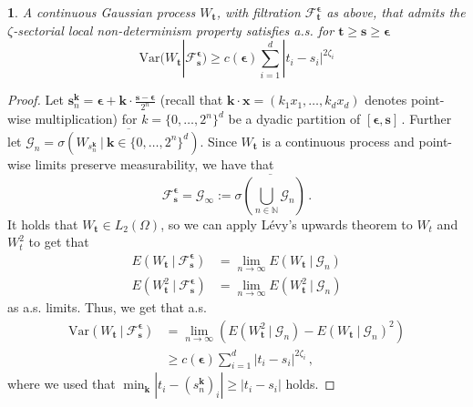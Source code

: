 \documentclass[11pt,oneside,english,reqno]{amsart}
\numberwithin{equation}{section}
\numberwithin{figure}{section}
\theoremstyle{plain}
\theoremstyle{definition}
\theoremstyle{remark}
\theoremstyle{plain}
\theoremstyle{plain}
\theoremstyle{plain}
\newtheorem{cor}[thm]{\protect\corollaryname}
\theoremstyle{plain}
\theoremstyle{plain}
\providecommand{\corollaryname}{Corollary}
\newcommand{\cF}{\mathcal{F}}
\newcommand{\cG}{\mathcal{G}}
\newcommand{\NN}{\mathbb{N}}
\newcommand{\bk}{\mathbf{k}}
\newcommand{\bT}{\mathbf{T}}
\newcommand{\bx}{\mathbf{x}}
\newcommand{\bs}{\mathbf{s}}
\newcommand{\bt}{\mathbf{t}}
\newcommand{\abs}[1]{\left\lvert #1\right\rvert}
\begin{document}



\begin{cor}\label{cor:sectorial_non_determinism}
    A continuous Gaussian process $W_\bt$, with filtration $\cF_\bt^{\boldsymbol\epsilon}$ as above, that admits the $\zeta$-sectorial local non-determinism property satisfies a.s. for $\bt\ge \bs\ge \boldsymbol{\epsilon}$
   \[
        \mbox{Var}(W_\bt| \mathcal{F}_\bs^{\boldsymbol\epsilon})\geq c(\boldsymbol\epsilon)\sum_{i=1}^d |t_i-s_i|^{2\zeta_i}
   \]
\end{cor}


\begin{proof}
    Let $\bs_n^\bk = \boldsymbol\epsilon + \bk\cdot\frac{\bs-\boldsymbol{\epsilon}}{2^n}$ (recall that $\bk\cdot\bx = (k_1x_1,\dots,k_dx_d)$ denotes point-wise multiplication) for $k= \{0,\dots,2^n\}^d$ be a dyadic partition of $[\boldsymbol\epsilon,\bs]$\,. Further let $\cG_n = \overline{\sigma(W_{s_n^\bk}~\vert~\bk\in\{0,\dots,2^n\}^d)}$. Since $W_\bt$ is a continuous process and point-wise limits preserve measurability, we have that
%
    \begin{equation*}
        \cF_\bs^{\boldsymbol\epsilon} = \cG_\infty := \overline{\sigma\left(\bigcup_{n\in\NN}\cG_n\right)}\,.
    \end{equation*}
%
    It holds that $W_\bt\in L_2(\Omega)$, so we can apply Lévy's upwards theorem to $W_t$ and $W_t^2$ to get that
%
    \begin{align*}
        E(W_\bt~\vert~\cF_\bs^{\boldsymbol\epsilon}) &= \lim_{n\to\infty}E(W_\bt~\vert~\cG_n) \\
        E(W_\bt^2~\vert~\cF_\bs^{\boldsymbol\epsilon}) &= \lim_{n\to\infty}E(W_\bt^2~\vert~\cG_n)
    \end{align*}
%
    as a.s. limits. Thus, we get that a.s.
%
    \begin{align*}
        \mbox{Var}(W_\bt~\vert~ \cF_\bs^{\boldsymbol\epsilon}) &= \lim_{n\to\infty}(E(W_\bt^2~\vert~\cG_n)-E(W_\bt~\vert~\cG_n)^2) \\
        &\ge c(\boldsymbol\epsilon)\sum_{i=1}^d\abs{t_i-s_i}^{2\zeta_i}\,,
    \end{align*}
%
    where we used that $\min_{\bk}\abs{t_i-(s_n^{\bk})_i}\ge\abs{t_i-s_i}$ holds.
\end{proof}
\end{document}
